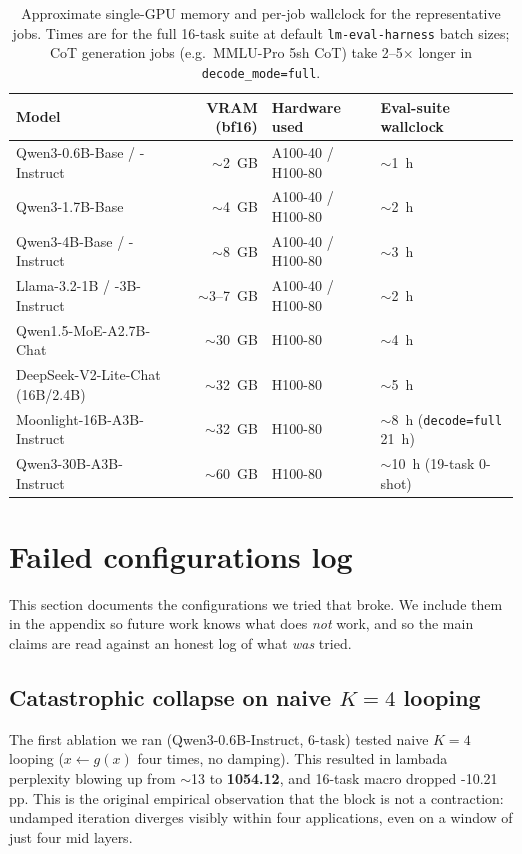 \begin{table}[h]
\centering
\footnotesize
\caption{Approximate single-GPU memory and per-job wallclock for the representative jobs. Times are for the full 16-task suite at default \texttt{lm-eval-harness} batch sizes; CoT generation jobs (e.g.\ MMLU-Pro 5sh CoT) take 2--5$\times$ longer in \texttt{decode\_mode=full}.}
\begin{tabular}{lrll}
\toprule
Model & VRAM (bf16) & Hardware used & Eval-suite wallclock \\
\midrule
Qwen3-0.6B-Base / -Instruct       &  $\sim$2~GB & A100-40 / H100-80 & $\sim$1~h \\
Qwen3-1.7B-Base                   &  $\sim$4~GB & A100-40 / H100-80 & $\sim$2~h \\
Qwen3-4B-Base / -Instruct         &  $\sim$8~GB & A100-40 / H100-80 & $\sim$3~h \\
Llama-3.2-1B / -3B-Instruct       &  $\sim$3--7~GB & A100-40 / H100-80 & $\sim$2~h \\
Qwen1.5-MoE-A2.7B-Chat            &  $\sim$30~GB & H100-80 & $\sim$4~h \\
DeepSeek-V2-Lite-Chat (16B/2.4B)  &  $\sim$32~GB & H100-80 & $\sim$5~h \\
Moonlight-16B-A3B-Instruct        &  $\sim$32~GB & H100-80 & $\sim$8~h (\texttt{decode=full} 21~h) \\
Qwen3-30B-A3B-Instruct            &  $\sim$60~GB & H100-80 & $\sim$10~h (19-task 0-shot) \\
\bottomrule
\end{tabular}
\end{table}


\section{Failed configurations log}
\label{app:failures}

This section documents the configurations we tried that broke. We include them in the appendix so future work knows what does \emph{not} work, and so the main claims are read against an honest log of what \emph{was} tried.

\subsection{Catastrophic collapse on naive \texorpdfstring{$K{=}4$}{K=4} looping}

The first ablation we ran (Qwen3-0.6B-Instruct, 6-task) tested naive $K{=}4$ looping ($x \leftarrow g(x)$ four times, no damping). This resulted in lambada perplexity blowing up from $\sim$13 to \textbf{1054.12}, and 16-task macro dropped -10.21 pp. This is the original empirical observation that the block is not a contraction: undamped iteration diverges visibly within four applications, even on a window of just four mid layers.

